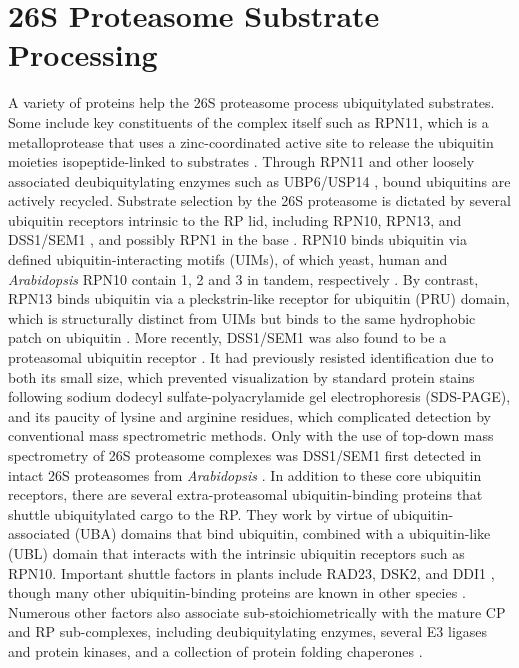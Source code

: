 \section{26S Proteasome Substrate Processing}
A variety of proteins help the 26S proteasome process ubiquitylated substrates. Some include key constituents of the complex itself such as RPN11, which is a metalloprotease that uses a zinc-coordinated active site to release the ubiquitin moieties isopeptide-linked to substrates \citep{verma02, worden14}.  Through RPN11 and other loosely associated deubiquitylating enzymes such as UBP6/USP14 \citep{hanna06, sakata11}, bound ubiquitins are actively recycled.
	Substrate selection by the 26S proteasome is dictated by several ubiquitin receptors intrinsic to the RP lid, including RPN10, RPN13, and DSS1/SEM1 \citep{fatimababy10, finley09, lin11, paraskevopoulos14, sakata12, van96}, and possibly RPN1 in the base \citep{elsasser02}.  RPN10 binds ubiquitin via defined ubiquitin-interacting motifs (UIMs), of which yeast, human and \textit{Arabidopsis} RPN10 contain 1, 2 and 3 in tandem, respectively \citep{fatimababy10, finley09, fu98, lin11, van96}.  By contrast, RPN13 binds ubiquitin via a pleckstrin-like receptor for ubiquitin (PRU) domain, which is structurally distinct from UIMs but binds to the same hydrophobic patch on ubiquitin \citep{husnjak08, schreiner08}.  More recently, DSS1/SEM1 was also found to be a proteasomal ubiquitin receptor \citep{paraskevopoulos14}.  It had previously resisted identification due to both its small size, which prevented visualization by standard protein stains following sodium dodecyl sulfate-polyacrylamide gel electrophoresis (SDS-PAGE), and its paucity of lysine and arginine residues, which complicated detection by conventional mass spectrometric methods.  Only with the use of top-down mass spectrometry of 26S proteasome complexes was DSS1/SEM1 first detected in intact 26S proteasomes from \textit{Arabidopsis} \citep{russell13}.  
	In addition to these core ubiquitin receptors, there are several extra-proteasomal ubiquitin-binding proteins that shuttle ubiquitylated cargo to the RP.  They work by virtue of ubiquitin-associated (UBA) domains that bind ubiquitin, combined with a ubiquitin-like (UBL) domain that interacts with the intrinsic ubiquitin receptors such as RPN10.  Important shuttle factors in plants include RAD23, DSK2, and DDI1 \citep{farmer10, fatimababy10, finley09, lin11}, though many other ubiquitin-binding proteins are known in other species \citep{husnjak12}.  Numerous other factors also associate sub-stoichiometrically with the mature CP and RP sub-complexes, including deubiquitylating enzymes, several E3 ligases and protein kinases, and a collection of protein folding chaperones \citep{besche14, book10, leggett02, xie00}.
	
